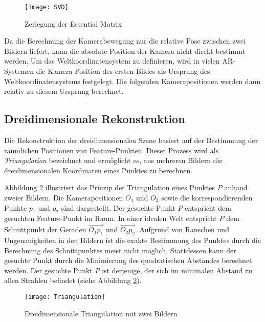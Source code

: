 \begin{figure}
    \centering
    \texttt{[image: SVD]}
    \caption{Zerlegung der Essential Matrix \cite{gao2021vSLAM}\label{fig:SVD}}\par
\end{figure}

Da die Berechnung der Kamerabewegung nur die relative Pose zwischen zwei Bildern liefert, kann die absolute Position der Kamera nicht direkt bestimmt werden. Um das Weltkoordinatensystem zu definieren, wird in vielen AR-Systemen die Kamera-Position des ersten Bildes als Ursprung des Weltkoordinatensystems festgelegt. Die folgenden Kamerapositionen werden dann relativ zu diesem Ursprung berechnet. \cite{gao2021vSLAM,appledevdoc}

\subsection{Dreidimensionale Rekonstruktion}

Die Rekonstruktion der dreidimensionalen Szene basiert auf der Bestimmung der räumlichen Positionen von Feature-Punkten. Dieser Prozess wird als \emph{Triangulation} bezeichnet und ermöglicht es, aus mehreren Bildern die dreidimensionalen Koordinaten eines Punktes zu berechnen. \cite{gao2021vSLAM}

Abbildung \ref{fig:Triangulation} illustriert das Prinzip der Triangulation eines Punktes \( P \) anhand zweier Bildern. Die Kamerapositionen \( O_1 \) und \( O_2 \) sowie die korrespondierenden Punkte \( p_1 \) und \( p_2 \) sind dargestellt. Der gesuchte Punkt \( P \) entspricht dem gesuchten Feature-Punkt im Raum. In einer idealen Welt entspricht \( P \) dem Schnittpunkt der Geraden \( \overrightarrow{O_1p_1} \) und \( \overrightarrow{O_2p_2} \). Aufgrund von Rauschen und Ungenauigkeiten in den Bildern ist die exakte Bestimmung des Punktes durch die Berechnung des Schnittpunktes meist nicht möglich. Stattdessen kann der gesuchte Punkt durch die Minimierung des quadratischen Abstandes berechnet werden. Der gesuchte Punkt \( P \) ist derjenige, der sich im minimalen Abstand zu allen Strahlen befindet (siehe Abbildung \ref{fig:Triangulation}). \cite{gao2021vSLAM}

\begin{figure}
    \centering
    \texttt{[image: Triangulation]}
    \caption{Dreidimensionale Triangulation mit zwei Bildern\label{fig:Triangulation}}\par
\end{figure}

